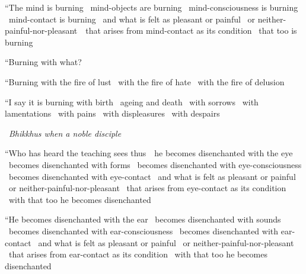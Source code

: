 \begin{english-only-hang}
  ``The mind is burning \breathmark\ mind-objects are burning \breathmark\ mind-consciousness is burning \breathmark\ mind-contact is burning \breathmark\ and what is felt as pleasant or painful \breathmark\ or neither-painful-nor-{pleasant}~\breathmark\ that arises from mind-contact as its condition \breathmark\ that too is burning
\end{english-only-hang}
\begin{english-only-hangtogether}
  ``Burning with what?
\end{english-only-hangtogether}
\begin{english-only-hangtogether}
  ``Burning with the fire of lust \breathmark\ with the fire of hate \breathmark\ with the fire of delusion
\end{english-only-hangtogether}
\begin{english-only-hangtogether}
  ``I say it is burning with birth \breathmark\ ageing and death \breathmark\ with sorrows \breathmark\ with lamentations \breathmark\ with pains \breathmark\ with displeasures \breathmark\ with despairs
\end{english-only-hangtogether}

\begin{english-only-leader}
  \anglebracketleft\ \hspace{-0.5mm}\textit{Bhikkhus when a noble disciple} \hspace{-0.5mm}\anglebracketright\
\end{english-only-leader}
\begin{english-only-hangtogether}
  ``Who has heard the teaching sees \mbox{thus}~\breathmark\ he becomes disenchanted with the eye \breathmark\ becomes disenchanted with forms \breathmark\ becomes disenchanted with eye-consciousness \breathmark\ becomes disenchanted with eye-contact \breathmark\ and what is felt as pleasant or painful \breathmark\ or neither-painful-nor-pleasant \breathmark\ that arises from eye-contact as its condition \breathmark\ with that too he becomes disenchanted
\end{english-only-hangtogether}

\begin{english-only-hang}
  ``He becomes disenchanted with the ear \breathmark\ becomes disenchanted with sounds \breathmark\ becomes disenchanted with ear-consciousness \breathmark\ becomes disenchanted with ear-contact \breathmark\ and what is felt as pleasant or painful \breathmark\ or neither-painful-nor-pleasant \breathmark\ that arises from ear-contact as its condition \breathmark\ with that too he becomes disenchanted
\end{english-only-hang}

